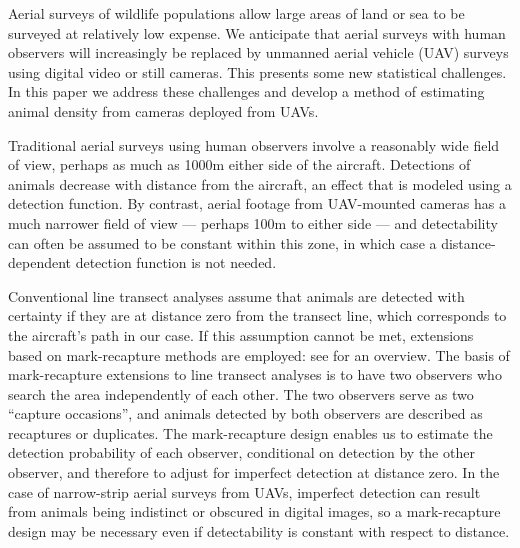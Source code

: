\documentclass[useAMS, usenatbib, referee]{biom}\usepackage[]{graphicx}\usepackage[]{color}
\begin{document}

  Aerial surveys of wildlife populations allow large areas of land or sea to be surveyed at relatively low expense. We anticipate that aerial surveys with human observers will increasingly be replaced by unmanned aerial vehicle (UAV) surveys using digital video or still cameras. This presents some new statistical challenges. In this paper we address these challenges and develop a method of estimating animal density from cameras deployed from UAVs.

Traditional aerial surveys using human observers involve a reasonably wide field of view, perhaps as much as 1000m either side of the aircraft. Detections of animals decrease with distance from the aircraft, an effect that is modeled using a detection function. By contrast, aerial footage from UAV-mounted cameras has a much narrower field of view --- perhaps 100m to either side --- and detectability can often be assumed to be constant within this zone, in which case a distance-dependent detection function is not needed.

Conventional line transect analyses assume that animals are detected with certainty if they are at distance zero from the transect line, which corresponds to the aircraft's path in our case. If this assumption cannot be met, extensions based on mark-recapture methods are employed: see \cite{Burt+al:14} for an overview. The basis of mark-recapture extensions to line transect analyses is to have two observers who search the area independently of each other. The two observers serve as two ``capture occasions'', and animals detected by both observers are described as recaptures or duplicates. The mark-recapture design enables us to estimate the detection probability of each observer, conditional on detection by the other observer, and therefore to adjust for imperfect detection at distance zero. In the case of narrow-strip aerial surveys from UAVs, imperfect detection can result from animals being indistinct or obscured in digital images, so a mark-recapture design may be necessary even if detectability is constant with respect to distance.
\end{document}

